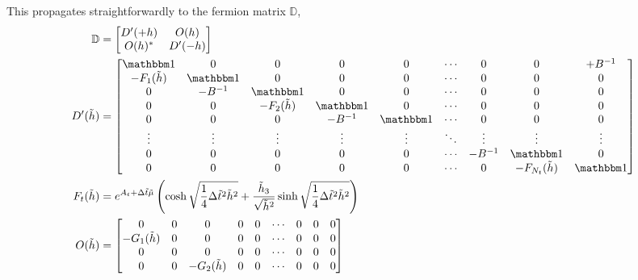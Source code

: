 This propagates straightforwardly to the fermion matrix $\mathbb{D}$,
\begin{align}
    \mathbb{D} &= \begin{bmatrix} D'(+h) & O(h) \\ O(h)\conjugate & D'(-h) \end{bmatrix}
    \\
    D'(\tilde{h}) &=
	\begin{bmatrix} 
	\one            & 0         & 0                 & 0         & 0      & \cdots & 0       & 0                     & +B^{-1}
\\	-F_1(\tilde{h}) & \one      & 0                 & 0         & 0      & \cdots & 0       & 0                     & 0
\\	0               & -B^{-1}   & \one              & 0         & 0      & \cdots & 0       & 0                     & 0
\\	0               & 0         & -F_2(\tilde{h})   & \one      & 0      & \cdots & 0       & 0                     & 0
\\	0               & 0         & 0                 & -B^{-1}   & \one   & \cdots & 0       & 0                     & 0
\\	\vdots          & \vdots    & \vdots            & \vdots    & \vdots & \ddots & \vdots  & \vdots                & \vdots
\\	0               & 0         & 0                 & 0         & 0      & \cdots & -B^{-1} & \one                  & 0
\\	0               & 0         & 0                 & 0         & 0      & \cdots & 0       & -F_{N_t}(\tilde{h})   & \one
	\end{bmatrix}
	\\
	F_t(\tilde{h}) &= e^{A_t + \Delta\tilde{t}\tilde{\mu}} \left(\cosh \sqrt{\oneover{4}\Delta\tilde{t}^2 \tilde{h}^2} + \frac{\tilde{h}_3}{\sqrt{\tilde{h}^2}} \sinh\sqrt{\oneover{4}\Delta\tilde{t}^2 \tilde{h}^2}\right)
    \\
    O(\tilde{h}) &=
	\begin{bmatrix} 
	0               & 0         & 0                 & 0         & 0      & \cdots & 0       & 0                    & 0
\\	-G_1(\tilde{h}) & 0         & 0                 & 0         & 0      & \cdots & 0       & 0                    & 0
\\	0               & 0         & 0                 & 0         & 0      & \cdots & 0       & 0                    & 0
\\	0               & 0         & -G_2(\tilde{h})   & 0         & 0      & \cdots & 0       & 0                    & 0

\end{bmatrix}
\end{align}
